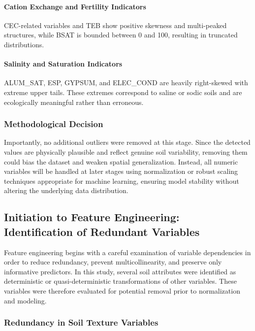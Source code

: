 \paragraph{Cation Exchange and Fertility Indicators}
CEC-related variables and TEB show positive skewness and multi-peaked structures, while BSAT is bounded between 0 and 100, resulting in truncated distributions.

\paragraph{Salinity and Saturation Indicators}
ALUM\_SAT, ESP, GYPSUM, and ELEC\_COND are heavily right-skewed with extreme upper tails. These extremes correspond to saline or sodic soils and are ecologically meaningful rather than erroneous.

\subsubsection*{Methodological Decision}

Importantly, no additional outliers were removed at this stage. Since the detected values are physically plausible and reflect genuine soil variability, removing them could bias the dataset and weaken spatial generalization. Instead, all numeric variables will be handled at later stages using normalization or robust scaling techniques appropriate for machine learning, ensuring model stability without altering the underlying data distribution\cite{wilson2021mlsoil}.

\subsection{Initiation to Feature Engineering: Identification of Redundant Variables}

Feature engineering begins with a careful examination of variable dependencies in order to reduce redundancy, prevent multicollinearity, and preserve only informative predictors. In this study, several soil attributes were identified as deterministic or quasi-deterministic transformations of other variables. These variables were therefore evaluated for potential removal prior to normalization and modeling.

\subsubsection{Redundancy in Soil Texture Variables}

